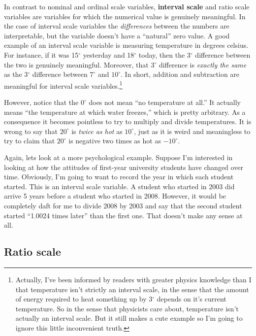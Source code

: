 \documentclass[
]{book}
\begin{document}
In contrast to nominal and ordinal scale variables, {\textbf{interval scale}} and ratio scale variables are variables for which the numerical value is genuinely meaningful. In the case of interval scale variables the \emph{differences} between the numbers are interpretable, but the variable doesn't have a ``natural'' zero value. A good example of an interval scale variable is measuring temperature in degrees celsius. For instance, if it was 15\(^\circ\) yesterday and 18\(^\circ\) today, then the 3\(^\circ\) difference between the two is genuinely meaningful. Moreover, that 3\(^\circ\) difference is \emph{exactly the same} as the 3\(^\circ\) difference between \(7^\circ\) and \(10^\circ\). In short, addition and subtraction are meaningful for interval scale variables.\footnote{Actually, I've been informed by readers with greater physics knowledge than I that temperature isn't strictly an interval scale, in the sense that the amount of energy required to heat something up by 3\(^\circ\) depends on it's current temperature. So in the sense that physicists care about, temperature isn't actually an interval scale. But it still makes a cute example so I'm going to ignore this little inconvenient truth.}

However, notice that the \(0^\circ\) does not mean ``no temperature at all.'' It actually means ``the temperature at which water freezes,'' which is pretty arbitrary. As a consequence it becomes pointless to try to multiply and divide temperatures. It is wrong to say that \(20^\circ\) is \emph{twice as hot} as \(10^\circ\), just as it is weird and meaningless to try to claim that \(20^\circ\) is negative two times as hot as \(-10^\circ\).

Again, lets look at a more psychological example. Suppose I'm interested in looking at how the attitudes of first-year university students have changed over time. Obviously, I'm going to want to record the year in which each student started. This is an interval scale variable. A student who started in 2003 did arrive 5 years before a student who started in 2008. However, it would be completely daft for me to divide 2008 by 2003 and say that the second student started ``1.0024 times later'' than the first one. That doesn't make any sense at all.

\hypertarget{ratio-scale}{%
\subsection{Ratio scale}\label{ratio-scale}}
\end{document}
